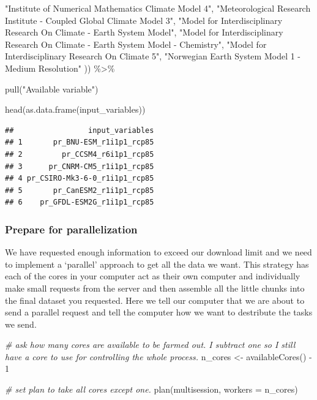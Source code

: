\documentclass[
  paper=a4,
  ,captions=tableheading
]{scrartcl}
\newenvironment{Shaded}{\begin{snugshade}}{\end{snugshade}}
\newcommand{\AttributeTok}[1]{\textcolor[rgb]{0.77,0.63,0.00}{#1}}
\newcommand{\CommentTok}[1]{\textcolor[rgb]{0.56,0.35,0.01}{\textit{#1}}}
\newcommand{\DecValTok}[1]{\textcolor[rgb]{0.00,0.00,0.81}{#1}}
\newcommand{\FunctionTok}[1]{\textcolor[rgb]{0.00,0.00,0.00}{#1}}
\newcommand{\NormalTok}[1]{#1}
\newcommand{\OtherTok}[1]{\textcolor[rgb]{0.56,0.35,0.01}{#1}}
\newcommand{\SpecialCharTok}[1]{\textcolor[rgb]{0.00,0.00,0.00}{#1}}
\newcommand{\StringTok}[1]{\textcolor[rgb]{0.31,0.60,0.02}{#1}}
\begin{document}
\begin{Shaded}
\begin{Highlighting}[]
 \StringTok{"Institute of Numerical Mathematics Climate Model 4"}\NormalTok{,                                           }
 \StringTok{"Meteorological Research Institute {-} Coupled Global Climate Model 3"}\NormalTok{,                           }
 \StringTok{"Model for Interdisciplinary Research On Climate {-} Earth System Model"}\NormalTok{,                         }
 \StringTok{"Model for Interdisciplinary Research On Climate {-} Earth System Model {-} Chemistry"}\NormalTok{,             }
 \StringTok{"Model for Interdisciplinary Research On Climate 5"}\NormalTok{,                                            }
 \StringTok{"Norwegian Earth System Model 1 {-} Medium Resolution"}\NormalTok{  )) }\SpecialCharTok{\%\textgreater{}\%}
  
  \FunctionTok{pull}\NormalTok{(}\StringTok{"Available variable"}\NormalTok{)}

\FunctionTok{head}\NormalTok{(}\FunctionTok{as.data.frame}\NormalTok{(input\_variables))}
\end{Highlighting}
\end{Shaded}

\begin{verbatim}
##                 input_variables
## 1       pr_BNU-ESM_r1i1p1_rcp85
## 2         pr_CCSM4_r6i1p1_rcp85
## 3      pr_CNRM-CM5_r1i1p1_rcp85
## 4 pr_CSIRO-Mk3-6-0_r1i1p1_rcp85
## 5       pr_CanESM2_r1i1p1_rcp85
## 6    pr_GFDL-ESM2G_r1i1p1_rcp85
\end{verbatim}

\hypertarget{prepare-for-parallelization}{%
\subsubsection{Prepare for
parallelization}\label{prepare-for-parallelization}}

We have requested enough information to exceed our download limit and we
need to implement a `parallel' approach to get all the data we want.
This strategy has each of the cores in your computer act as their own
computer and individually make small requests from the server and then
assemble all the little chunks into the final dataset you requested.
Here we tell our computer that we are about to send a parallel request
and tell the computer how we want to destribute the tasks we send.

\begin{Shaded}
\begin{Highlighting}[]
\CommentTok{\# ask how many cores are available to be farmed out. I subtract one so I still have a core to use for controlling the whole process. }
\NormalTok{n\_cores }\OtherTok{\textless{}{-}} \FunctionTok{availableCores}\NormalTok{() }\SpecialCharTok{{-}} \DecValTok{1}

\CommentTok{\# set plan to take all cores except one. }
\FunctionTok{plan}\NormalTok{(multisession, }\AttributeTok{workers =}\NormalTok{ n\_cores)}
\end{Highlighting}
\end{Shaded}
\end{document}
